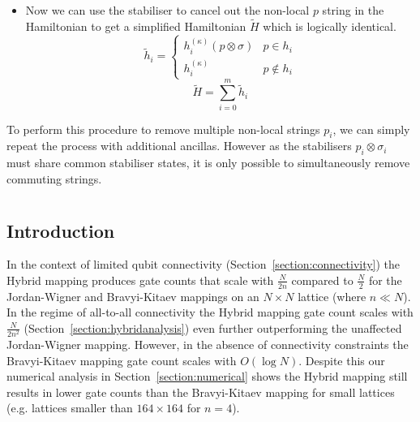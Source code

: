 \begin{itemize}
\begin{equation}
    \label{eq:equivalent_to_original_hamiltonian}
    H^{(\kappa)}\ket{\tilde \psi}_{SA} = V (H \otimes I) \ket{\psi}_S \ket{0}_A
\end{equation}
\item Now we can use the stabiliser to cancel out the non-local $p$ string in the Hamiltonian to get a simplified Hamiltonian $\tilde H$ which is logically identical.
\begin{equation}
   \tilde h_i = \begin{cases} h_i^{(\kappa)} (p \otimes \sigma)  &  p \in h_i \\ 
   h_i^{(\kappa)} & p \notin h_i \end{cases}
\end{equation}
\begin{equation}
    \tilde H = \sum_{i=0}^m \tilde h_i
\end{equation}
\end{itemize}
To perform this procedure to remove multiple non-local strings $p_i$, we can simply repeat the process with additional ancillas. However as the stabilisers $p_i \otimes \sigma_i$ must share common stabiliser states, it is only possible to simultaneously remove commuting strings.

\chapter[Hybrid Mappings]{}
\label{section:hybrid_mappings}
\section{Introduction}
 In the context of limited qubit connectivity (Section~\ref{section:connectivity}) the Hybrid mapping produces gate counts that scale with $\frac{N}{2n}$ compared to $\frac{N}{2}$ for the Jordan-Wigner and Bravyi-Kitaev mappings on an $N\times N$ lattice (where $n \ll N$). In the regime of all-to-all connectivity the Hybrid mapping gate count scales with $\frac{N}{2n^2}$ (Section~\ref{section:hybridanalysis}) even further outperforming the unaffected Jordan-Wigner mapping. However, in the absence of connectivity constraints the Bravyi-Kitaev mapping gate count scales with $O(\log N)$. Despite this our numerical analysis in Section~\ref{section:numerical} shows the Hybrid mapping still results in lower gate counts than the Bravyi-Kitaev mapping for small lattices (e.g. lattices smaller than $164 \times 164$ for $n=4$).

